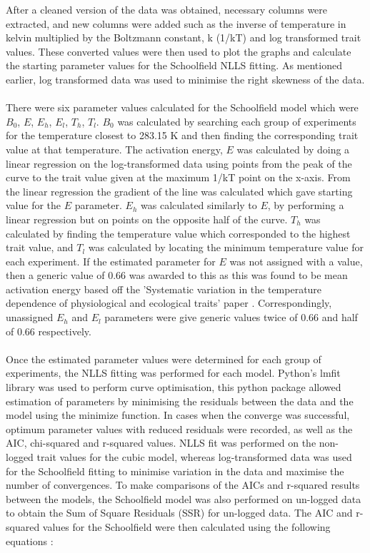{After a cleaned version of the data was obtained, necessary columns were extracted, and new columns were added such as the inverse of temperature in kelvin multiplied by the Boltzmann constant, k (1/kT) and log transformed trait values. These converted values were then used to plot the graphs and calculate the starting parameter values for the Schoolfield NLLS fitting. As mentioned earlier, log transformed data was used to minimise the right skewness of the data.  
\\~\\
There were six parameter values calculated for the Schoolfield model which were $B_0$, $E$, $E_h$, $E_l$, $T_h$, $T_l$. $B_0$ was calculated by searching each group of experiments for the temperature closest to 283.15 K and then finding the corresponding trait value at that temperature. The activation energy, $E$ was calculated by doing a linear regression on the log-transformed data using points from the peak of the curve to the trait value given at the maximum 1/kT point on the x-axis. From the linear regression the gradient of the line was calculated which gave starting value for the $E$ parameter. $E_h$ was calculated similarly to $E$, by performing a linear regression but on points on the opposite half of the curve. $T_h$ was calculated by finding the temperature value which corresponded to the highest trait value, and $T_l$ was calculated by locating the minimum temperature value for each experiment. If the estimated parameter for $E$ was not assigned with a value, then a generic value of 0.66 was awarded to this as this was found to be mean activation energy based off the 'Systematic variation in the temperature dependence of physiological and ecological traits' paper \citep{Dell2011}. Correspondingly, unassigned $E_h$ and $E_l$ parameters were give generic values twice of 0.66 and half of 0.66 respectively. 
\\~\\
Once the estimated parameter values were determined for each group of experiments, the NLLS fitting was performed for each model. Python's lmfit library \citep{Newville2014} was used to perform curve optimisation, this python package allowed estimation of parameters by minimising the residuals between the data and the model using the minimize function. In cases when the converge was successful, optimum parameter values with reduced residuals were recorded, as well as the AIC, chi-squared and r-squared values. NLLS fit was performed on the non-logged trait values for the cubic model, whereas log-transformed data was used for the Schoolfield fitting to minimise variation in the data and maximise the number of convergences. To make comparisons of the AICs and r-squared results between the models, the Schoolfield model was also performed on un-logged data to obtain the Sum of Square Residuals (SSR) for un-logged data. The AIC and r-squared values for the Schoolfield were then calculated using the following equations \citep{Wagenmakers2004}:  
}
